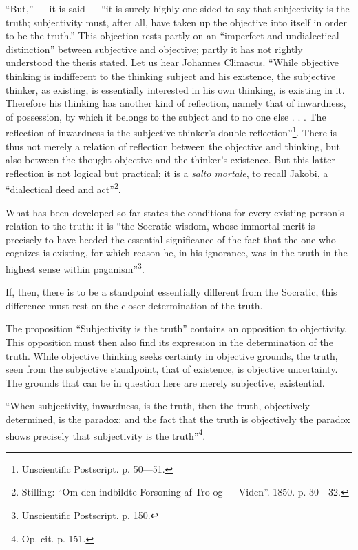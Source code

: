 \documentclass[12pt,a4paper]{book}
\newcommand{\opage}[1]{\marginnote{\footnotesize\textit{[#1]}}}
\begin{document}
\opage{22}\setcounter{footnote}{0}%
``But,'' --- it is said --- ``it is surely highly one-sided to say that subjectivity is the truth; subjectivity must, after all, have taken up the objective into itself in order to be the truth.'' This objection rests partly on an ``imperfect and undialectical distinction'' between subjective and objective; partly it has not rightly understood the thesis stated. Let us hear Johannes Climacus. ``While objective thinking is indifferent to the thinking subject and his existence, the subjective thinker, as existing, is essentially interested in his own thinking, is existing in it. Therefore his thinking has another kind of reflection, namely that of inwardness, of possession, by which it belongs to the subject and to no one else . . . The reflection of inwardness is the subjective thinker's double reflection''\footnote{Unscientific Postscript. p. 50---51.}. There is thus not merely a relation of reflection between the objective and thinking, but also between the thought objective and the thinker's existence. But this latter reflection is not logical but practical; it is a \textit{salto mortale}, to recall Jakobi, a ``dialectical deed and act''\footnote{Stilling: ``Om den indbildte Forsoning af Tro og --- Viden''. 1850. p. 30---32.}.

What has been developed so far states the conditions for every existing person's relation to the truth: it is ``the Socratic wisdom, whose immortal merit is precisely to have heeded the essential significance of the fact that the one who cognizes is existing, for which reason he, in his ignorance, was in the truth in the highest sense within paganism''\footnote{Unscientific Postscript. p. 150.}.

If, then, there is to be a standpoint essentially different from the Socratic, this difference must rest on the closer determination of the truth.

The proposition ``Subjectivity is the truth'' contains an opposition to
objectivity. This opposition must then also find its expression in the determination of the truth. While
\opage{23}\setcounter{footnote}{0}%
objective thinking seeks certainty in objective grounds, the truth, seen from the subjective standpoint, that of existence, is objective uncertainty. The grounds that can be in question here are merely subjective, existential.

``When subjectivity, inwardness, is the truth, then the truth, objectively determined, is the paradox; and the fact that the truth is objectively the paradox shows precisely that subjectivity is the truth''\footnote{Op. cit. p. 151.}.
\end{document}
